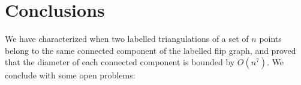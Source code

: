
\section{Conclusions}
\label{sec:conclusions}

We have characterized when 
two labelled triangulations of a set of $n$ points belong to the same connected component of the labelled flip graph, and proved that the diameter of each connected component is bounded by $O(n^7)$.
We conclude with some open problems:

